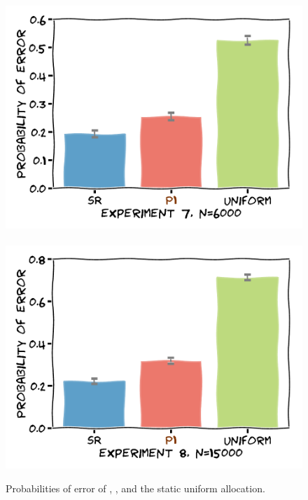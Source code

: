 \begin{figure}[H]
				\includegraphics[width =.46\textwidth]{./image/exp7.pdf}$\qquad$\includegraphics[width =.46\textwidth]{./image/exp8.pdf}
				\caption{Probabilities of error of \SR, \Pone, and the static uniform allocation.}\label{exp}
\end{figure}
